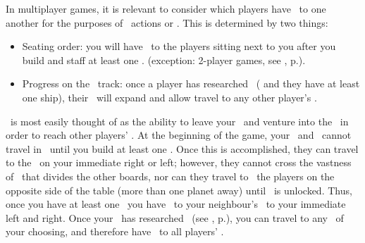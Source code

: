 In multiplayer games, it is relevant to consider which players have \reach\ to 
one another for the purposes of \military\ actions or \trade.  This is 
determined by two things:
\begin{itemize}
	\item Seating order: you will have \reach\ to the players sitting next to you 
        after you build and staff at least one \starship. (exception: 2-player 
        games, see , p.\pageref{sec:playercount}).
	\item Progress on the \tech\ track: once a player has researched \warpdrive\ (
        and they have at least one ship), their \reach\ will expand and allow 
        travel to any other player's \planet.
\end{itemize}
\reach\ is most easily thought of as the ability to leave your \planet\ and 
venture into the \outerspace\ in order to reach other players' \planets.  At the
beginning of the game, your \convoys\ and \squadrons\ cannot travel in 
\outerspace\ until you build at least one \starship.  Once this is 
accomplished, they can travel to the \planet\ on your immediate right or left; 
however, they cannot cross the vastness of \outerspace\ that divides the other
boards, nor can they travel to \reach\ the players on the opposite side of the 
table (more than one planet away) until \warpdrive\ is unlocked.
\newline\newline
Thus, once you have at least one \starship\ you have \reach\ to your neighbour's
\planet\ to your immediate left and right.  Once your \planet\ has researched 
\warpdrive\ (see , p.\pageref{sec:technology}), you can 
travel to any \planet\ of your choosing, and therefore have \reach\ to all 
players' \planets.
